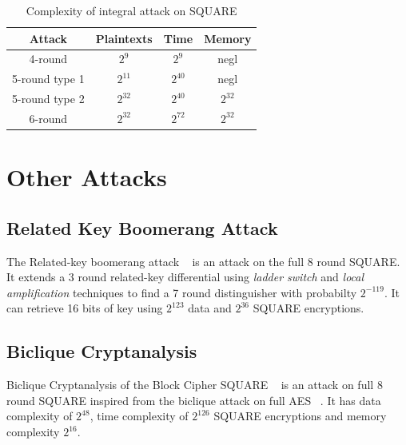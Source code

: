\documentclass[preprint]{transcrypto}
\begin{document}
\begin{table}
  \centering
  \begin{tabular}{|c|c|c|c|}
    \hline
    Attack          & Plaintexts & Time     & Memory   \\
    \hline
    4-round         & $2^9$      & $2^9$    & negl     \\
    5-round  type 1 & $2^{11}$   & $2^{40}$ & negl     \\
    5-round  type 2 & $2^{32}$   & $2^{40}$ & $2^{32}$ \\
    6-round         & $2^{32}$   & $2^{72}$ & $2^{32}$ \\
    \hline
  \end{tabular}

  \caption{Complexity of integral attack on SQUARE}
  \label{tab:complexity}
\end{table}

\section{Other Attacks}
\subsection{Related Key Boomerang Attack}
The Related-key boomerang attack ~\cite{EPRINT:KooYeoSon10} is an attack on the full 8 round SQUARE. It extends a 3 round related-key differential using \textit{ladder switch} and \textit{local amplification} techniques to find a 7 round distinguisher with probabilty $2^{-119}$. It can retrieve 16 bits of key using $2^{123}$ data and $2^{36}$ SQUARE encryptions.

\subsection{Biclique Cryptanalysis}
Biclique Cryptanalysis of the Block Cipher SQUARE ~\cite{EPRINT:Mala11} is an attack on full 8 round SQUARE inspired from the biclique attack on full AES ~\cite{AC:BogKhoRec11}. It has data complexity of $2^{48}$, time complexity of $2^{126}$ SQUARE encryptions and memory complexity $2^{16}$.



\end{document}
